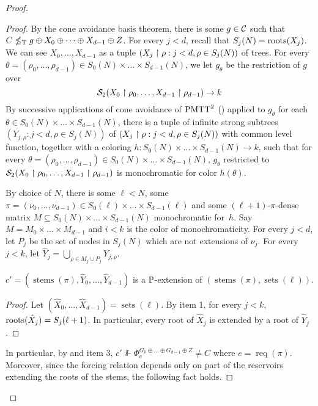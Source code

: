 \begin{proof}
\begin{proof}
	By the cone avoidance basis theorem, there is some $g \in \mathcal{C}$ such that $C \nleq_{\text{\upshape T}} g \oplus X_0 \oplus \dots \oplus X_{d-1} \oplus Z$. 
	For every $j < d$, recall that $S_j(N) = \operatorname{roots}(X_j)$.
	We can see $X_0, \dots, X_{d-1}$ as a tuple $( X_j \upharpoonright \rho: j < d, \rho \in S_j(N) )$ of trees.
	For every $\theta = ( \rho_0, \dots, \rho_{d-1}) \in S_0(N) \times \dots \times S_{d-1}(N)$, we let $g_\theta$ be the restriction of $g$ over
	$$
		\mathcal{S}_{2}({X_0 \upharpoonright \rho_0, \dots, X_{d-1} \upharpoonright \rho_{d-1}}) \to k
	$$
	By successive applications of cone avoidance of $\mathrm{PMTT}^{2}_{}$ () applied to $g_\theta$ for each  $\theta \in S_0(N) \times \dots \times S_{d-1}(N)$,
	there is a tuple of infinite strong subtrees $( Y_{j,\rho}: j < d, \rho \in S_j(N) )$ of $( X_j \upharpoonright \rho: j < d, \rho \in S_j(N) )$ with common level function, together with a coloring $h: S_0(N) \times \dots \times S_{d-1}(N) \to k$,
		such that for every  $\theta = ( \rho_0, \dots, \rho_{d-1}) \in S_0(N) \times \dots \times S_{d-1}(N)$,
		 $g_\theta$ restricted to $\mathcal{S}_{2}({X_0 \upharpoonright \rho_0, \dots, X_{d-1} \upharpoonright \rho_{d-1}})$ is monochromatic for color $h(\theta)$. 
		
	By choice of $N$, there is some $\ell < N$, some $\pi = (\nu_0, \dots, \nu_{d-1}) \in S_0(\ell) \times \dots \times S_{d-1}(\ell)$ and some $(\ell+1)$-$\pi$-dense matrix $M \subseteq S_0(N) \times \dots \times S_{d-1}(N)$ monochromatic for~$h$. Say $M = M_0 \times \dots \times M_{d-1}$ and $i < k$ is the color of monochromaticity.
	For every $j < d$, let $P_j$ be the set of nodes in $S_j(N)$ which are not extensions of $\nu_j$. For every $j < k$, let $\hat{Y}_j = \bigcup_{\rho \in M_j \cup P_j} Y_{j,\rho}$.
	
	\begin{fact}\label{fact:pmtt2-level-homogeneous-case2-exts}
	$c' = (\operatorname{stems}(\pi), \hat{Y}_0, \dots, \hat{Y}_{d-1})$
	is a $\mathbb{P}$-extension of $(\operatorname{stems}(\pi), \operatorname{sets}(\ell))$.
	\end{fact}
	\begin{proof}
	Let $(\hat{X}_0, \dots, \hat{X}_{d-1}) = \operatorname{sets}(\ell)$.
	By item 1, for every $j < k$, $\operatorname{roots}(\hat{X}_j) = S_j(\ell+1)$. In particular, every root of $\hat{X}_j$ is extended by a root of $\hat{Y}_j$.
	\end{proof}
	
	In particular, by  and item 3, $c' \nVdash \Phi_e^{G_0 \oplus \dots \oplus G_{d-1} \oplus Z} \neq C$ where $e = \operatorname{req}(\pi)$.
	Moreover, since the forcing relation depends only on part of the reservoirs extending the roots of the stems, the following fact holds.
	

\end{proof}
\end{proof}
